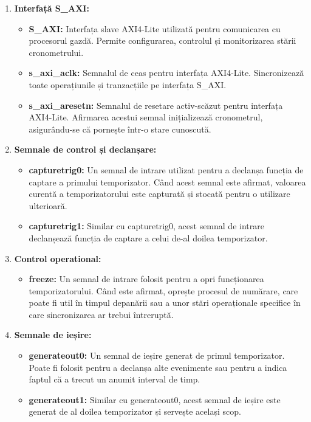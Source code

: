 \documentclass[12pt]{article}
\begin{document}
\begin{enumerate}
    \item \textbf{Interfață S\_AXI:}
    \begin{itemize}
        \item \textbf{S\_AXI:} Interfața slave AXI4-Lite utilizată pentru comunicarea cu procesorul gazdă. Permite configurarea, controlul și monitorizarea stării cronometrului.
        \item \textbf{s\_axi\_aclk:} Semnalul de ceas pentru interfața AXI4-Lite. Sincronizează toate operațiunile și tranzacțiile pe interfața S\_AXI.
        \item \textbf{s\_axi\_aresetn:} Semnalul de resetare activ-scăzut pentru interfața AXI4-Lite. Afirmarea acestui semnal inițializează cronometrul, asigurându-se că pornește într-o stare cunoscută.
    \end{itemize}
    \item \textbf{Semnale de control și declanșare:}
    \begin{itemize}
        \item \textbf{capturetrig0:} Un semnal de intrare utilizat pentru a declanșa funcția de captare a primului temporizator. Când acest semnal este afirmat, valoarea curentă a temporizatorului este capturată și stocată pentru o utilizare ulterioară.
        \item \textbf{capturetrig1:} Similar cu capturetrig0, acest semnal de intrare declanșează funcția de captare a celui de-al doilea temporizator.
    \end{itemize}
    \item \textbf{Control operational:}
    \begin{itemize}
        \item \textbf{freeze:} Un semnal de intrare folosit pentru a opri funcționarea temporizatorului. Când este afirmat, oprește procesul de numărare, care poate fi util în timpul depanării sau a unor stări operaționale specifice în care sincronizarea ar trebui întreruptă.
    \end{itemize}
    \item \textbf{Semnale de ieșire:}
    \begin{itemize}
        \item \textbf{generateout0:} Un semnal de ieșire generat de primul temporizator. Poate fi folosit pentru a declanșa alte evenimente sau pentru a indica faptul că a trecut un anumit interval de timp.
        \item \textbf{generateout1:} Similar cu generateout0, acest semnal de ieșire este generat de al doilea temporizator și servește același scop.

\end{itemize}
\end{enumerate}
\end{document}
